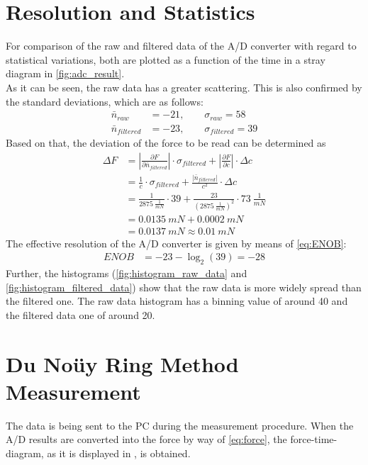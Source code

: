     \section{Resolution and Statistics}
        For comparison of the raw and filtered data of the A/D converter with regard to statistical variations, both are plotted as a function of the time in a stray diagram in \cref{fig:adc_result}.\\
        As it can be seen, the raw data has a greater scattering. This is also confirmed by the standard deviations, which are as follows:
        \begin{align*}
            \bar{n}_{raw}&=-21, \qquad \sigma_{raw}=58\\
            \bar{n}_{filtered}&=-23, \qquad \sigma_{filtered}=39
        \end{align*}
        Based on that, the deviation of the force to be read can be determined as
        \begin{align*}
            \Delta F&=\left| \frac{\partial F}{\partial \bar{n}_{filtered}} \right| \cdot \sigma_{filtered} + \left| \frac{\partial F}{\partial c} \right| \cdot \Delta c \\
            &=\frac{1}{c} \cdot \sigma_{filtered} + \frac{\left|\bar{n}_{filtered}\right|}{c^2} \cdot \Delta c \\
            &=\frac{1}{\SI{2875}{\frac{1}{mN}}} \cdot 39 + \frac{23}{(\SI{2875}{\frac{1}{mN}})^2} \cdot \SI{73}{\frac{1}{mN}} \\
            &=\SI{0.0135}{mN}+\SI{0.0002}{mN} \\
            &=\SI{0.0137}{mN} \approx \SI{0.01}{mN}
        \end{align*}
        The effective resolution of the A/D converter is given by means of \cref{eq:ENOB}:
        \begin{align*}
            ENOB&=-23-\log_2(39)=-28
        \end{align*}
        Further, the histograms (\cref{fig:histogram_raw_data} and \cref{fig:histogram_filtered_data}) show that the raw data is more widely spread than the filtered one. The raw data histogram has a binning value of around 40 and the filtered data one of around 20.
    \section{Du Noüy Ring Method Measurement}
        The data is being sent to the PC during the measurement procedure. When the A/D results are converted into the force by way of \cref{eq:force}, the force-time-diagram, as it is displayed in , is obtained.

